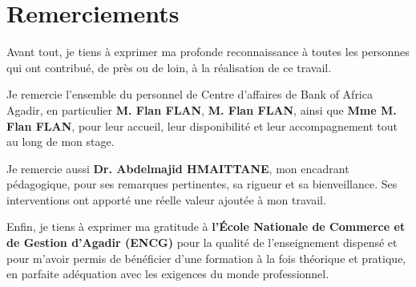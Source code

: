 \cleardoublepage
{}
{}
\chapter*{Remerciements}

Avant tout, je tiens à exprimer ma profonde reconnaissance à toutes les personnes qui ont
contribué, de près ou de loin, à la réalisation de ce travail.

Je remercie l’ensemble du personnel de Centre d'affaires de Bank of Africa Agadir, en particulier \textbf{M. Flan FLAN}, \textbf{M. Flan FLAN}, ainsi que \textbf{Mme M. Flan FLAN}, pour leur accueil, leur
disponibilité et leur accompagnement tout au long de mon stage.

Je remercie aussi \textbf{Dr. Abdelmajid HMAITTANE}, mon encadrant pédagogique, pour ses remarques
pertinentes, sa rigueur et sa bienveillance. Ses interventions ont apporté une réelle valeur ajoutée
à mon travail.

Enfin, je tiens à exprimer ma gratitude à \textbf{l’École Nationale de Commerce et de Gestion d’Agadir
(ENCG)} pour la qualité de l’enseignement dispensé et pour m’avoir permis de bénéficier d’une
formation à la fois théorique et pratique, en parfaite adéquation avec les exigences du monde
professionnel.
